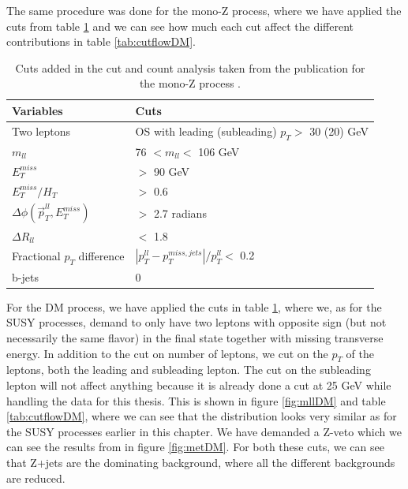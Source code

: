 The same procedure was done for the mono-Z process, where we have applied the cuts from table \ref{tab:cutsDM} and we can see how much each cut affect the different contributions in table \ref{tab:cutflowDM}. 


\begin{table}[H]
    \centering
    \begin{tabular}{l l}\toprule
    \textbf{Variables} & \textbf{Cuts}\\
    \midrule
    \midrule
    Two leptons     &  OS with leading (subleading) $p_T >$ 30 (20) GeV\\
    $m_{ll}$     & 76 $< m_{ll} <$ 106 GeV\\
    $E_T^{miss}$ & $>$ 90 GeV\\
    $E_T^{miss}/H_T$ & $>$ 0.6\\
    $\Delta \phi (\Vec{p}_T^{ll}, E_T^{miss})$ & $>$ 2.7 radians\\
    $\Delta R_{ll}$ & $<$ 1.8\\
    Fractional $p_T$ difference & $|p_T^{ll} - p_T^{miss, jets}|/p_T^{ll} <$ 0.2\\
    b-jets & 0\\
    \bottomrule
     \end{tabular}
    \caption{Cuts added in the cut and count analysis taken from the publication for the mono-Z process \cite{monoZexclusion}.}
    \label{tab:cutsDM}
\end{table}

For the DM process, we have applied the cuts in table \ref{tab:cutsDM}, where we, as for the SUSY processes, demand to only have two leptons with opposite sign (but not necessarily the same flavor) in the final state together with missing transverse energy. In addition to the cut on number of leptons, we cut on the $p_T$ of the leptons, both the leading and subleading lepton. The cut on the subleading lepton will not affect anything because it is already done a cut at 25 GeV while handling the data for this thesis. This is shown in figure \ref{fig:mllDM} and table \ref{tab:cutflowDM}, where we can see that the distribution looks very similar as for the SUSY processes earlier in this chapter. We have demanded a Z-veto which we can see the results from in figure \ref{fig:metDM}. For both these cuts, we can see that Z+jets are the dominating background, where all the different backgrounds are reduced. 


